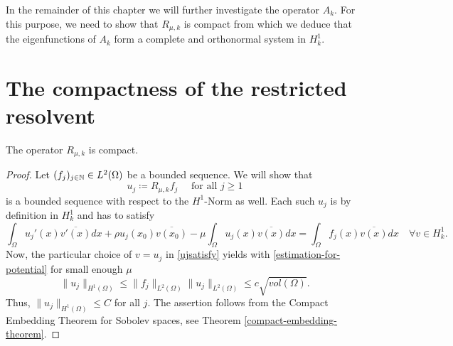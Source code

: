 In the remainder of this chapter we will further investigate the operator $A_{k}$. For this purpose, we need to show that $R_{\mu, k}$ is compact from which we deduce that the eigenfunctions of $A_{k}$ form a complete and orthonormal system in $H^{1}_{k}$.

\section{The compactness of the restricted resolvent} 

\begin{theorem} \label{3.1:thm-Rmuk.isCompact}
	The operator $R_{\mu, k}$ is compact.

	\begin{proof}
	Let $(f_{j})_{j \in \mathbb{N}} \in L^{2}(\Omega)$ be a  bounded sequence. We will show that 
		\[ u_{j} \coloneqq R_{\mu, k} f_{j} \quad \text{ for all } j \geq 1 \]
	is a bounded sequence with respect to the $H^{1}$-Norm as well. Each such $u_{j}$ is by definition in $H^{1}_{k}$ and has to satisfy
		\begin{equation}
			\int_{\Omega} u_{j}'(x) \overline{v'(x)} dx + \rho u_{j}(x_{0}) \overline{v(x_{0})} - \mu \int_{\Omega} u_{j}(x) \overline{v(x)} dx = \int_{\Omega} f_{j}(x) \overline{v(x)} dx \quad \forall v \in H^{1}_{k}. \label{ujsatisfy}
		\end{equation} 
	Now, the particular choice of $v = u_{j}$ in \eqref{ujsatisfy} yields with \eqref{estimation-for-potential} for small enough $\mu$
		\[  \| u_{j} \|_{H^{1}(\Omega)} \leq \| f_{j} \|_{L^{2}(\Omega)} \| u_{j} \|_{L^{2}(\Omega)} \leq c \sqrt{vol(\Omega)}. \]
	Thus, $\| u_{j} \|_{H^{1}(\Omega)} \leq C$ for all $j$. The assertion follows from the Compact Embedding Theorem for Sobolev spaces, see Theorem \ref{compact-embedding-theorem}.
	\end{proof}	
\end{theorem}		

